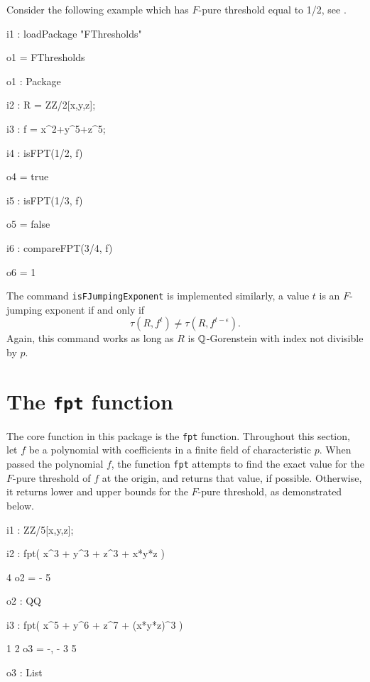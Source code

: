 \documentclass{amsart}
\begin{document}
Consider the following example which has $F$-pure threshold equal to {1/2}, see \cite[Example 4.3]{MustataYoshidaTestIdealVsMultiplierIdeals}.
\medskip
{\small
{}
\begin{MyVerbatim}
i1 : loadPackage "FThresholds"

o1 = FThresholds

o1 : Package

i2 : R = ZZ/2[x,y,z];

i3 : f = x^2+y^5+z^5;

i4 : isFPT(1/2, f)

o4 = true

i5 : isFPT(1/3, f)

o5 = false

i6 : compareFPT(3/4, f)

o6 = 1
\end{MyVerbatim}
}
\medskip

The command {\tt isFJumpingExponent} is implemented similarly, a value $t$ is an $F$-jumping exponent if and only if
\[
\tau(R, f^t) \neq \tau(R, f^{t-\epsilon}).  
\]
Again, this command works as long as $R$ is $\mathbb{Q}$-Gorenstein with index not divisible by $p$. 


\newpage
\section{The {\tt fpt} function}
\label{sec.FPT}

The core function in this package is the {\tt fpt} function.  Throughout this section, let $f$ be a polynomial with coefficients in a finite field of characteristic $p$. When passed the polynomial $f$, the function {\tt fpt} attempts to find the exact value for the $F$-pure threshold of $f$ at the origin, and returns that value, if possible.  Otherwise, it returns lower and upper bounds for the $F$-pure threshold, as demonstrated below.
     
{\small
{}
\begin{MyVerbatim}

i1 : ZZ/5[x,y,z];

i2 : fpt( x^3 + y^3 + z^3 + x*y*z )

     4
o2 = -
     5

o2 : QQ

i3 : fpt( x^5 + y^6 + z^7 + (x*y*z)^3 )

      1  2
o3 = {-, -}
      3  5

o3 : List

\end{MyVerbatim}
}
            
\end{document}
